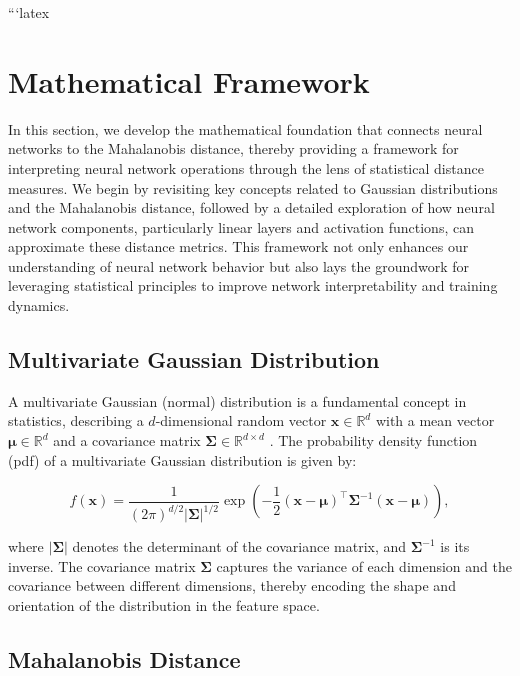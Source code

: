 ```latex

\section{Mathematical Framework}
\label{sec:math_framework}

In this section, we develop the mathematical foundation that connects neural networks to the Mahalanobis distance, thereby providing a framework for interpreting neural network operations through the lens of statistical distance measures. We begin by revisiting key concepts related to Gaussian distributions and the Mahalanobis distance, followed by a detailed exploration of how neural network components, particularly linear layers and activation functions, can approximate these distance metrics. This framework not only enhances our understanding of neural network behavior but also lays the groundwork for leveraging statistical principles to improve network interpretability and training dynamics.

\subsection{Multivariate Gaussian Distribution}

A multivariate Gaussian (normal) distribution is a fundamental concept in statistics, describing a $d$-dimensional random vector $\mathbf{x} \in \mathbb{R}^d$ with a mean vector $\boldsymbol{\mu} \in \mathbb{R}^d$ and a covariance matrix $\boldsymbol{\Sigma} \in \mathbb{R}^{d \times d}$ \citep{bishop2006pattern}. The probability density function (pdf) of a multivariate Gaussian distribution is given by:

\begin{equation}
\label{eq:multivariate_gaussian}
f(\mathbf{x}) = \frac{1}{(2\pi)^{d/2} |\boldsymbol{\Sigma}|^{1/2}} \exp\left( -\frac{1}{2} (\mathbf{x} - \boldsymbol{\mu})^\top \boldsymbol{\Sigma}^{-1} (\mathbf{x} - \boldsymbol{\mu}) \right),
\end{equation}

where $|\boldsymbol{\Sigma}|$ denotes the determinant of the covariance matrix, and $\boldsymbol{\Sigma}^{-1}$ is its inverse. The covariance matrix $\boldsymbol{\Sigma}$ captures the variance of each dimension and the covariance between different dimensions, thereby encoding the shape and orientation of the distribution in the feature space.

\subsection{Mahalanobis Distance}


